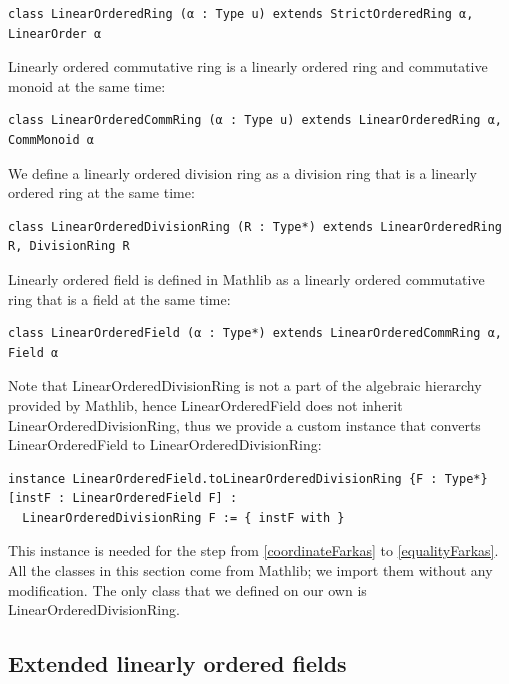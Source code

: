 \documentclass[]{article}
\renewcommand{\.}{\hskip .75pt}
\begin{document}
\begin{lstlisting}
class LinearOrderedRing (α : Type u) extends StrictOrderedRing α, LinearOrder α
\end{lstlisting}
Linearly ordered commutative ring is a linearly ordered ring and commutative monoid at the same time:
\begin{lstlisting}
class LinearOrderedCommRing (α : Type u) extends LinearOrderedRing α, CommMonoid α
\end{lstlisting}
We define a linearly ordered division ring as a division ring that is a linearly ordered ring at the same time:
\begin{lstlisting}
class LinearOrderedDivisionRing (R : Type*) extends LinearOrderedRing R, DivisionRing R
\end{lstlisting}
Linearly ordered field is defined in Mathlib as a linearly ordered commutative ring that is a field at the same time:
\begin{lstlisting}
class LinearOrderedField (α : Type*) extends LinearOrderedCommRing α, Field α
\end{lstlisting}
Note that LinearOrderedDivisionRing is not a part of the algebraic hierarchy provided by Mathlib,
hence LinearOrderedField does not inherit LinearOrderedDivisionRing, thus we provide a custom
instance that converts LinearOrderedField to LinearOrderedDivisionRing:
\begin{lstlisting}
instance LinearOrderedField.toLinearOrderedDivisionRing {F : Type*} [instF : LinearOrderedField F] :
  LinearOrderedDivisionRing F := { instF with }
\end{lstlisting}
This instance is needed for the step from \ref{coordinateFarkas} to \ref{equalityFarkas}.
All the classes in this section come from Mathlib; we import them without any modification.
The only class that we defined on our own is LinearOrderedDivisionRing.

\subsection{Extended linearly ordered fields}
\end{document}
